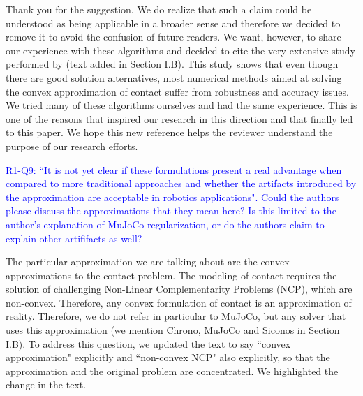 Thank you for the suggestion. We do realize that such a claim could be
understood as being applicable in a broader sense and therefore we decided to
remove it to avoid the confusion of future readers. We want, however, to share
our experience with these algorithms and decided to cite the very extensive
study performed by \cite{bib:acary2018solving} (text added in Section I.B). This
study shows that even though there are good solution alternatives, most
numerical methods aimed at solving the convex approximation of contact suffer
from robustness and accuracy issues. We tried many of these algorithms ourselves
and had the same experience. This is one of the reasons that inspired our
research in this direction and that finally led to this paper. We hope this new
reference helps the reviewer understand the purpose of our research efforts.
\vspace{5mm}

\textcolor{blue}{R1-Q9: ``It is not yet clear if these formulations present a real
advantage when compared to more traditional approaches and whether the artifacts
introduced by the approximation are acceptable in robotics applications". Could
the authors please discuss the approximations that they mean here? Is this
limited to the author's explanation of MuJoCo regularization, or do the authors
claim to explain other artififacts as well?}

The particular approximation we are talking about are the convex approximations
to the contact problem. The modeling of contact requires the solution of
challenging Non-Linear Complementarity Problems (NCP), which are non-convex.
Therefore, any convex formulation of contact is an approximation of reality.
Therefore, we do not refer in particular to MuJoCo, but any solver that uses
this approximation (we mention Chrono, MuJoCo and Siconos in Section I.B).
To address this question, we updated the text to say ``convex approximation"
explicitly and ``non-convex NCP" also explicitly, so that the approximation
and the original problem are concentrated. We highlighted the change in the
text.
